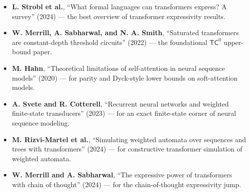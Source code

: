 \begin{itemize}
  \item \textbf{L. Strobl et al.}, ``What formal languages can transformers express? A survey'' (2024) \cite{StroblEtAl2024} --- the best overview of transformer expressivity results.
  \item \textbf{W. Merrill, A. Sabharwal, and N. A. Smith}, ``Saturated transformers are constant-depth threshold circuits'' (2022) \cite{MerrillSabharwalSmith2022} --- the foundational $\mathsf{TC}^0$ upper-bound paper.
  \item \textbf{M. Hahn}, ``Theoretical limitations of self-attention in neural sequence models'' (2020) \cite{Hahn2020} --- for parity and Dyck-style lower bounds on soft-attention models.
  \item \textbf{A. Svete and R. Cotterell}, ``Recurrent neural networks and weighted finite-state transducers'' (2023) \cite{SveteCotterell2023} --- for an exact finite-state corner of neural sequence modeling.
  \item \textbf{M. Rizvi-Martel et al.}, ``Simulating weighted automata over sequences and trees with transformers'' (2024) \cite{RizviEtAl2024} --- for constructive transformer simulation of weighted automata.
  \item \textbf{W. Merrill and A. Sabharwal}, ``The expressive power of transformers with chain of thought'' (2024) \cite{MerrillSabharwal2024} --- for the chain-of-thought expressivity jump.
\end{itemize}
